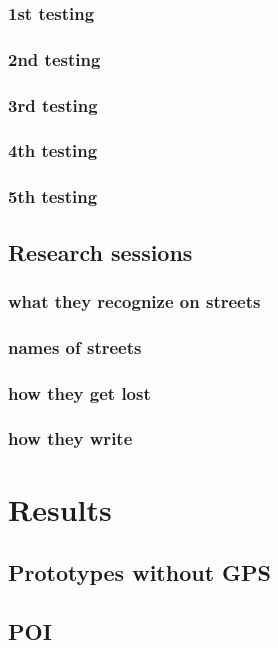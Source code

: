 \documentclass[11pt,oneside,a4paper]{book}
\begin{document}
			\subsection{1st testing}
				\label{sec:1th-testing}
			\subsection{2nd testing}
				\label{sec:2th-testing}
			\subsection{3rd testing}
				\label{sec:3th-testing}
			\subsection{4th testing}
				\label{sec:4th-testing}
			\subsection{5th testing}
				\label{sec:5th-testing}
		\section{Research sessions}
			\subsection{what they recognize on streets}
			\subsection{names of streets}
			\subsection{how they get lost}
			\subsection{how they write}
	
	\chapter{Results}
		\section{Prototypes without GPS}
			\section{POI}		
\end{document}
